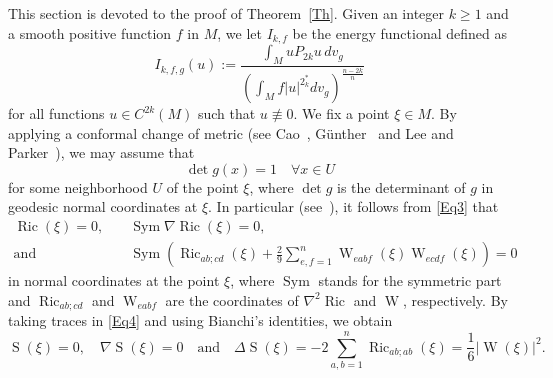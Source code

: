 \documentclass[reqno]{amsart}
\numberwithin{equation}{section}
\DeclareMathOperator{\Scal}{S}
\DeclareMathOperator{\Ricci}{Ric}
\DeclareMathOperator{\Weyl}{W}
\DeclareMathOperator{\Sym}{Sym}
\newcommand{\<}{\left<}
\renewcommand{\>}{\right>}
\renewcommand{\[}{\left[}
\renewcommand{\]}{\right]}
\renewcommand{\(}{\left(}
\renewcommand{\)}{\right)}
\begin{document}
This section is devoted to the proof of Theorem~\ref{Th}. Given an integer $k\ge1$ and a smooth positive function $f$ in $M$, we let $I_{k,f}$ be the energy functional defined as
\begin{equation}\label{Eq2}
I_{k,f,g}\(u\):=\frac{\displaystyle\int_MuP_{2k}u\,dv_g}{\displaystyle\(\int_Mf\left|u\right|^{2^*_k}dv_g\)^{\frac{n-2k}{n}}}
\end{equation}
for all functions $u\in C^{2k}\(M\)$ such that $u\not\equiv0$. We fix a point $\xi\in M$. By applying a conformal change of metric (see Cao~\cite{Cao}, G\"{u}nther~\cite{Gun} and Lee and Parker~\cite{LeePar}), we may assume that 
\begin{equation}\label{Eq3}
\det g\(x\)=1\quad\forall x\in U
\end{equation}
for some neighborhood $U$ of the point $\xi$, where $\det g$ is the determinant of $g$ in geodesic normal coordinates at $\xi$. In particular (see~\cite{LeePar}), it follows from \eqref{Eq3} that
\begin{align}\label{Eq4}
\Ricci\(\xi\)=0,\quad&\Sym\nabla\Ricci\(\xi\)=0,\nonumber\\
\text{and}\quad&\Sym\(\Ricci_{ab;cd}\(\xi\)+\frac{2}{9}\sum_{e,f=1}^n\Weyl_{eabf}\(\xi\)\Weyl_{ecdf}\(\xi\)\)=0
\end{align}
in normal coordinates at the point $\xi$, where $\Sym$ stands for the symmetric part and $\Ricci_{ab;cd}$ and $\Weyl_{eabf}$ are the coordinates of $\nabla^2\Ricci$ and $\Weyl$, respectively. By taking traces in \eqref{Eq4} and using Bianchi's identities, we obtain
\begin{equation}\label{Eq5}
\Scal\(\xi\)=0,\quad\nabla \Scal\(\xi\)=0\quad\text{and}\quad\Delta \Scal\(\xi\)=-2\sum_{a,b=1}^n\Ricci_{ab;ab}\(\xi\)=\frac{1}{6}\left|\Weyl\(\xi\)\right|^2.
\end{equation}
\end{document}
